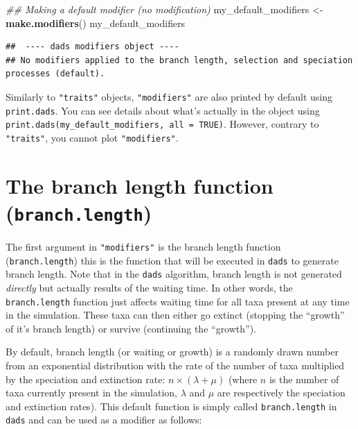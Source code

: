 \documentclass[]{book}
\newenvironment{Shaded}{\begin{snugshade}}{\end{snugshade}}
\newcommand{\CommentTok}[1]{\textcolor[rgb]{0.56,0.35,0.01}{\textit{#1}}}
\newcommand{\KeywordTok}[1]{\textcolor[rgb]{0.13,0.29,0.53}{\textbf{#1}}}
\newcommand{\NormalTok}[1]{#1}
\newcommand{\StringTok}[1]{\textcolor[rgb]{0.31,0.60,0.02}{#1}}
\begin{document}
\begin{Shaded}
\begin{Highlighting}[]
\CommentTok{## Making a default modifier (no modification)}
\NormalTok{my_default_modifiers <-}\StringTok{ }\KeywordTok{make.modifiers}\NormalTok{()}
\NormalTok{my_default_modifiers}
\end{Highlighting}
\end{Shaded}

\begin{verbatim}
##  ---- dads modifiers object ---- 
## No modifiers applied to the branch length, selection and speciation processes (default).
\end{verbatim}

Similarly to \texttt{"traits"} objects, \texttt{"modifiers"} are also printed by default using \texttt{print.dads}.
You can see details about what's actually in the object using \texttt{print.dads(my\_default\_modifiers,\ all\ =\ TRUE)}.
However, contrary to \texttt{"traits"}, you cannot plot \texttt{"modifiers"}.

\hypertarget{the-branch-length-function-branch.length}{%
\section{\texorpdfstring{The branch length function (\texttt{branch.length})}{The branch length function (branch.length)}}\label{the-branch-length-function-branch.length}}

The first argument in \texttt{"modifiers"} is the branch length function (\texttt{branch.length}) this is the function that will be executed in \texttt{dads} to generate branch length.
Note that in the \texttt{dads} algorithm, branch length is not generated \emph{directly} but actually results of the waiting time.
In other words, the \texttt{branch.length} function just affects waiting time for all taxa present at any time in the simulation.
These taxa can then either go extinct (stopping the ``growth'' of it's branch length) or survive (continuing the ``growth'').

By default, branch length (or waiting or growth) is a randomly drawn number from an exponential distribution with the rate of the number of taxa multiplied by the speciation and extinction rate: \(n \times (\lambda + \mu)\) (where \(n\) is the number of taxa currently present in the simulation, \(\lambda\) and \(\mu\) are respectively the speciation and extinction rates).
This default function is simply called \texttt{branch.length} in \texttt{dads} and can be used as a modifier as follows:
\end{document}
